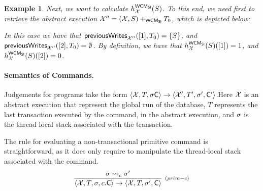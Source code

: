 \documentclass[a4paper,UKenglish]{article}%
\theoremstyle{plain}
\newtheorem{example}[thm]{\sc Example}
\begin{document}
\begin{example}
Next, we want to calculate $h_{\mathcal{X}}^{\mathsf{WCM}_{\mathsf{SI}}}(S)$. To this end, we need first 
to retrieve the abstract execution $\mathcal{X}'' = (\mathcal{X}, S) +_{\mathsf{WCM}_{\mathsf{SI}}} T_0$, 
which is depicted below:
\begin{center}
\end{center}
In this case we have that $\mathsf{previousWrites}_{\mathcal{X}''}([1],T_0) = \{S\}$, 
and $\mathsf{previousWrites}_{\mathcal{X}''}([2], T_0) = \emptyset$. By definition, 
we have that $h_{\mathcal{X}}^{\mathsf{WCM}_{\mathsf{SI}}}(S)([1]) = 1$, 
and $h_{\mathcal{X}}^{\mathsf{WCM}_{\mathsf{SI}}}(S)([2]) = 0$.
\end{example}

\paragraph{\textbf{Semantics of Commands.}}
Judgements for programs take the form 
$\langle \mathcal{X}, T, \sigma \mathsf{C} \rangle \rightarrow \langle \mathcal{X}', T',  \sigma', \mathsf{C}' \rangle
$.Here $\mathcal{X}$ is an abstract execution that represent 
the global run of the database, 
$T$ represents the last transaction executed by the command, in the abstract execution, 
and $\sigma$ is the thread local stack associated with the transaction.

The rule for evaluating a non-transactional primitive command is straightforward, as it 
does only require to manipulate the thread-local stack associated  with the command. 
\[
\infer[{\scriptstyle{(prim-c)}}]
{\langle \aexec, T, \thdstack, \primc.\Cmd \rangle \rightarrow \langle \aexec, T, \thdstack', \Cmd \rangle}
{\thdstack \rightsquigarrow_c \thdstack'} 
\]
\end{document}
